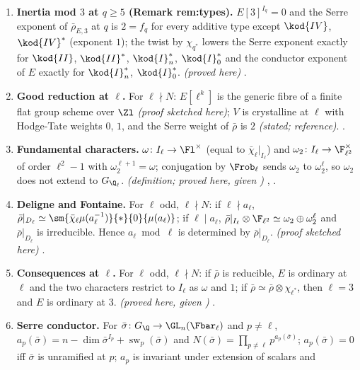 \begin{enumerate}[label=\textbf{\thechapter.\arabic*}]
\item \textbf{Inertia mod $3$ at $q\ge5$ (Remark rem:types).} $E[3]^{I_q}=0$ and the Serre exponent of $\bar\rho_{E,3}$ at $q$ is $2=f_q$ for
every additive type except $\kod{IV}$, $\kod{IV}^*$ (exponent $1$); the twist by $\chi_{q^*}$ lowers the Serre exponent exactly for
$\kod{II}$, $\kod{II}^*$, $\kod{I}_n^*$, $\kod{I}_0^*$ and the conductor exponent of $E$ exactly for $\kod{I}_n^*$, $\kod{I}_0^*$. \emph{(proved here)}
.
\item \textbf{Good reduction at $\ell$.} For $\ell\nmid N$: $E[\ell^k]$ is the generic fibre of a finite flat group scheme over $\Zl$
\emph{(proof sketched here)}; $V$ is crystalline at $\ell$ with Hodge-Tate weights $0$, $1$, and the Serre weight of $\bar\rho$ is $2$ \emph{(stated;
reference)}. .
\item \textbf{Fundamental characters.} $\omega\colon I_\ell\to\Fl^\times$ (equal to $\bar\chi_\ell|_{I_\ell}$) and $\omega_2\colon I_\ell\to\F_{\ell^2}^\times$ of order
$\ell^2-1$ with $\omega_2^{\ell+1}=\omega$; conjugation by $\Frob_\ell$ sends $\omega_2$ to $\omega_2^\ell$, so $\omega_2$ does not extend to $G_{\Q_\ell}$.
\emph{(definition; proved here, given )} ,
.
\item \textbf{Deligne and Fontaine.} For $\ell$ odd, $\ell\nmid N$: if $\ell\nmid a_\ell$, $\bar\rho|_{D_\ell}\simeq\sm{\bar\chi_\ell\mu(a_\ell^{-1})}{*}{0}{\mu(a_\ell)}$; if
$\ell\mid a_\ell$, $\bar\rho|_{I_\ell}\otimes\F_{\ell^2}\simeq\omega_2\oplus\omega_2^\ell$ and $\bar\rho|_{D_\ell}$ is irreducible. Hence $a_\ell\bmod\ell$ is determined by
$\bar\rho|_{D_\ell}$. \emph{(proof sketched here)} .
\item \textbf{Consequences at $\ell$.} For $\ell$ odd, $\ell\nmid N$: if $\bar\rho$ is reducible, $E$ is ordinary at $\ell$ and the two characters
restrict to $I_\ell$ as $\omega$ and $1$; if $\bar\rho\simeq\bar\rho\otimes\chi_{\ell^*}$, then $\ell=3$ and $E$ is ordinary at $3$. \emph{(proved here, given
)}
.
\item \textbf{Serre conductor.} For $\bar\sigma\colon G_\Q\to\GL_n(\Fbar_\ell)$ and $p\ne\ell$, $a_p(\bar\sigma)=n-\dim\bar\sigma^{I_p}+\operatorname{sw}_p(\bar\sigma)$ and
$N(\bar\sigma)=\prod_{p\ne\ell}p^{a_p(\bar\sigma)}$; $a_p(\bar\sigma)=0$ iff $\bar\sigma$ is unramified at $p$; $a_p$ is invariant under extension of scalars and

\end{enumerate}
